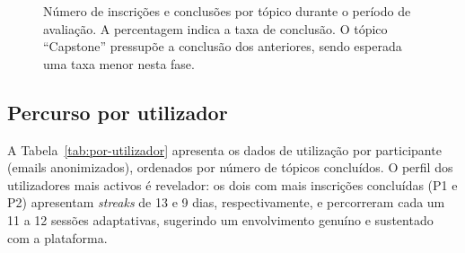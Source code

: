 \begin{figure}[h]
	\caption[Inscrições e conclusões por tópico]{Número de inscrições e conclusões por tópico durante o período de avaliação. A percentagem indica a taxa de conclusão. O tópico ``Capstone'' pressupõe a conclusão dos anteriores, sendo esperada uma taxa menor nesta fase.}
	\label{fig:conclusao-topicos}
\end{figure}

\subsection*{Percurso por utilizador}

A Tabela~\ref{tab:por-utilizador} apresenta os dados de utilização por participante (emails anonimizados), ordenados por número de tópicos concluídos. O perfil dos utilizadores mais activos é revelador: os dois com mais inscrições concluídas (P1 e P2) apresentam \emph{streaks} de 13 e 9 dias, respectivamente, e percorreram cada um 11 a 12 sessões adaptativas, sugerindo um envolvimento genuíno e sustentado com a plataforma.

